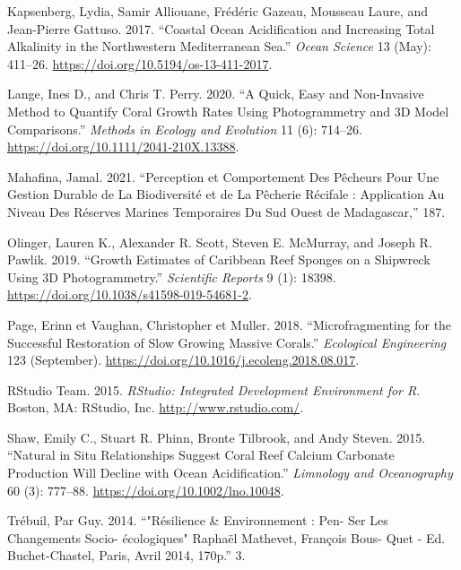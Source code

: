 \documentclass[]{article}
\begin{document}
\leavevmode\hypertarget{ref-kapsenberg_coastal_2017}{}%
Kapsenberg, Lydia, Samir Alliouane, Frédéric Gazeau, Mousseau Laure, and
Jean-Pierre Gattuso. 2017. ``Coastal Ocean Acidification and Increasing
Total Alkalinity in the Northwestern Mediterranean Sea.'' \emph{Ocean
Science} 13 (May): 411--26.
\url{https://doi.org/10.5194/os-13-411-2017}.

\leavevmode\hypertarget{ref-lange_quick_2020}{}%
Lange, Ines D., and Chris T. Perry. 2020. ``A Quick, Easy and
Non-Invasive Method to Quantify Coral Growth Rates Using Photogrammetry
and 3D Model Comparisons.'' \emph{Methods in Ecology and Evolution} 11
(6): 714--26. \url{https://doi.org/10.1111/2041-210X.13388}.

\leavevmode\hypertarget{ref-mahafina_perception_2021}{}%
Mahafina, Jamal. 2021. ``Perception et Comportement Des Pêcheurs Pour
Une Gestion Durable de La Biodiversité et de La Pêcherie Récifale :
Application Au Niveau Des Réserves Marines Temporaires Du Sud Ouest de
Madagascar,'' 187.

\leavevmode\hypertarget{ref-olinger_growth_2019}{}%
Olinger, Lauren K., Alexander R. Scott, Steven E. McMurray, and Joseph
R. Pawlik. 2019. ``Growth Estimates of Caribbean Reef Sponges on a
Shipwreck Using 3D Photogrammetry.'' \emph{Scientific Reports} 9 (1):
18398. \url{https://doi.org/10.1038/s41598-019-54681-2}.

\leavevmode\hypertarget{ref-page_microfragmenting_2018}{}%
Page, Erinn et Vaughan, Christopher et Muller. 2018. ``Microfragmenting
for the Successful Restoration of Slow Growing Massive Corals.''
\emph{Ecological Engineering} 123 (September).
\url{https://doi.org/10.1016/j.ecoleng.2018.08.017}.

\leavevmode\hypertarget{ref-rstudio}{}%
RStudio Team. 2015. \emph{RStudio: Integrated Development Environment
for R}. Boston, MA: RStudio, Inc. \url{http://www.rstudio.com/}.

\leavevmode\hypertarget{ref-shaw_natural_2015}{}%
Shaw, Emily C., Stuart R. Phinn, Bronte Tilbrook, and Andy Steven. 2015.
``Natural in Situ Relationships Suggest Coral Reef Calcium Carbonate
Production Will Decline with Ocean Acidification.'' \emph{Limnology and
Oceanography} 60 (3): 777--88. \url{https://doi.org/10.1002/lno.10048}.

\leavevmode\hypertarget{ref-trebuil_resilience_2014}{}%
Trébuil, Par Guy. 2014. ``"Résilience \& Environnement : Pen- Ser Les
Changements Socio- écologiques" Raphaël Mathevet, François Bous- Quet -
Ed. Buchet-Chastel, Paris, Avril 2014, 170p.'' 3.
\end{document}
